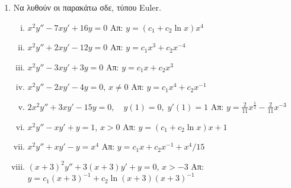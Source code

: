\begin{enumerate}
\item Να λυθούν οι παρακάτω σδε, τύπου Euler.
  \begin{enumerate}[i)]
    \item $ x^{2}y''-7xy'+16y=0 $ \hfill Απ: $ y= (c_{1}+ c_{2} \ln{x})x^{4} $ 
    \item $ x^{2}y'' + 2xy' - 12y=0 $ \hfill Απ: $ y= c_{1}x^{3} + c_{2}x^{-4} $  
    \item $ x^{2}y''-3xy'+3y=0 $ \hfill Απ: $ y=c_{1}x + c_{2}x^{3} $
    \item $ x^{2}y''-2xy'-4y=0 $,\; $ x \neq 0 $ 
      \hfill Απ: $ y=c_{1}x^{4}+ c_{2} x^{-1} $ 
    \item $ 2x^{2}y''+3xy'-15y=0, \quad y(1)=0, \; y'(1)=1 $
      \hfill Απ: $ y= \frac{2}{11} x^{\frac{5}{2}} - \frac{2}{11} x^{-3} $ 
    \item $ x^{2}y''-xy'+y=1 $,\; $ x>0 $ 
      \hfill Απ: $ y=(c_{1}+c_{2} \ln{x})x + 1 $  
    \item $ x^{2}y''+xy'-y=x^{4} $ 
      \hfill Απ: $ y=c_{1}x+c_{2}x^{-1}+ x^{4}/{15} $ 
    \item \label{eul} $ (x+3)^{2}y''+3(x+3)y'+y=0 $,\; $ x>-3 $ 
      \hfill Απ: $ y=c_{1} (x+3)^{-1} + c_{2}\ln(x+3)(x+3)^{-1} $
  \end{enumerate}

\end{enumerate}

